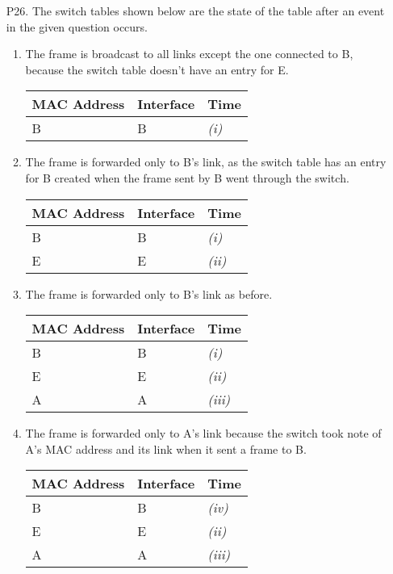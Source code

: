 \documentclass{article}
\begin{document}
\begin{enumerate}
    \item[P26.] The switch tables shown below are the state of the table after an event in the given question occurs.
    \begin{enumerate}[label=\textit{(\roman*)}]
        \item The frame is broadcast to all links except the one connected to B, because the switch table doesn't have an entry for E.
        
        \begin{tabular}{@{}lll@{}}
            \toprule
            MAC Address & Interface & Time \\ \midrule
            B & B & \textit{(i)} \\ \bottomrule
        \end{tabular}

        \item The frame is forwarded only to B's link, as the switch table has an entry for B created when the frame sent by B went through the switch.
        
        \begin{tabular}{@{}lll@{}}
            \toprule
            MAC Address & Interface & Time \\ \midrule
            B & B & \textit{(i)} \\
            E & E & \textit{(ii)} \\ \bottomrule
        \end{tabular}

        \item The frame is forwarded only to B's link as before.
        
        \begin{tabular}{@{}lll@{}}
            \toprule
            MAC Address & Interface & Time \\ \midrule
            B & B & \textit{(i)} \\
            E & E & \textit{(ii)} \\
            A & A & \textit{(iii)} \\ \bottomrule
        \end{tabular}

        \item The frame is forwarded only to A's link because the switch took note of A's MAC address and its link when it sent a frame to B.
        
        \begin{tabular}{@{}lll@{}}
            \toprule
            MAC Address & Interface & Time \\ \midrule
            B & B & \textit{(iv)} \\
            E & E & \textit{(ii)} \\
            A & A & \textit{(iii)} \\ \bottomrule
        \end{tabular}
    \end{enumerate}
\end{enumerate}
\end{document}
